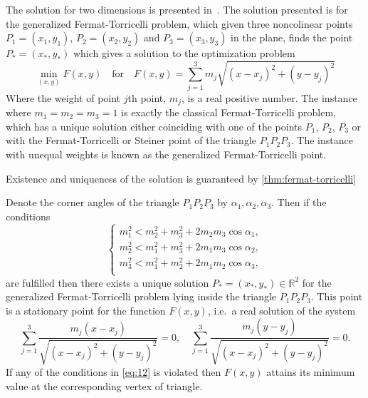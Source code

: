 The solution for two dimensions is presented in~\cite{Uteshev2012}.  The solution
presented is for the generalized Fermat-Torricelli problem, which given three
noncolinear points $P_1 = (x_1, y_1)$, $P_2 = (x_2, y_2)$ and $P_3 = (x_3, y_3)$
in the plane, finds the point $P_\ast = (x_\ast, y_\ast)$ which gives a solution
to the optimization problem
%
\begin{equation}
  \label{eq:11}
  \min_{(x,y)} F(x,y) \quad \text{for} \quad F(x,y) = \sum_{j=1}^3 m_j
  \sqrt{{(x-x_j)}^2 + {(y-y_j)}^2}
\end{equation}
%
Where the weight of point $j$th point, $m_j$, is a real positive number.  The
instance where $m_1 = m_2 = m_3 = 1$ is exactly the classical Fermat-Torricelli
problem, which has a unique solution either coinciding with one of the points
$P_1$, $P_2$, $P_3$ or with the Fermat-Torricelli or Steiner point of the
triangle $P_1 P_2 P_3$.  The instance with unequal weights is known as the
generalized Fermat-Torricelli point.

Existence and uniqueness of the solution is guaranteed by
\cref{thm:fermat-torricelli}
%
\begin{theorem}
  Denote the corner angles of the triangle $P_1 P_2 P_3$ by $\alpha_1, \alpha_2,
  \alpha_3$. Then if the conditions
  \begin{equation}
    \label{eq:12}
    \left\{
      \begin{array}{c}
        m_1^2 < m_2^2 + m_3^2 + 2 m_2 m_3 \cos \alpha_1 , \\
        m_2^2 < m_1^2 + m_3^2 + 2 m_1 m_3 \cos \alpha_2 , \\
        m_3^2 < m_1^2 + m_2^2 + 2 m_1 m_2 \cos \alpha_3 , \\
      \end{array}
    \right.
  \end{equation}
  are fulfilled then there exists a unique solution $P_\ast = (x_\ast, y_\ast)
  \in \mathbb{R}^2$ for the generalized Fermat-Torricelli problem lying inside
  the triangle $P_1 P_2 P_3$.  This point is a stationary point for the function
  $F(x,y)$, i.e.\ a real solution of the system
  \begin{equation}
    \label{eq:13}
    \sum_{j=1}^3 \frac{m_j(x-x_j)}{\sqrt{{(x-x_j)}^2 + {(y - y_j)}^2}} = 0, \quad
    \sum_{j=1}^3 \frac{m_j(y-y_j)}{\sqrt{{(x-x_j)}^2 + {(y - y_j)}^2}} = 0.
  \end{equation}
  If any of the conditions in \cref{eq:12} is violated then $F(x,y)$ attains its
  minimum value at the corresponding vertex of triangle.
\end{theorem}
%


